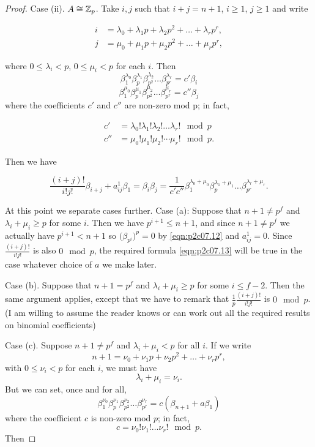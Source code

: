 \documentclass[../main]{subfiles}
\begin{document}
\begin{proof}
Case (ii). $A \cong \mathbb{Z}_p$. Take $i, j$ such that $i + j = n + 1$, $i \ge 1$, $j \ge 1$ and write 

\begin{align*}
i & = \lambda_0 + \lambda_1 p + \lambda_2 p^2 + \ldots + \lambda_r p^r, \\ j & = \mu_0 + \mu_1 p + \mu_2 p^2 + \ldots + \mu_r p^r,
\end{align*}

where $0 \le \lambda_i < p$, $0 \le \mu_i < p$ for each $i$. Then \[\beta_1^{\lambda_0} \beta_p^{\lambda_1} \beta_{p^2}^{\lambda_2} \ldots \beta_{p^r}^{\lambda_r} = c'\beta_i\] \[\beta_1^{\mu_0} \beta_p^{\mu_1} \beta_{p^2}^{\mu_2} \ldots \beta_{p^r}^{\mu_r} = c''\beta_j\] where the coefficients $c'$ and $c''$ are non-zero mod p; in fact,

\begin{align*}
c' & = \lambda_0! \lambda_1! \lambda_2! \ldots \lambda_r! \mod p \\ c'' & = \mu_0! \mu_1! \mu_2! \cdots \mu_r! \mod p.
\end{align*}

Then we have 

\[\frac {(i + j)!} {i! j!} \beta_{i + j} + a_{ij}^1 \beta_1 = \beta_i \beta_j = \frac 1 {c' c''} \beta_1^{\lambda_0 + \mu_0} \beta_p^{\lambda_1 + \mu_1} \ldots \beta_{p^r}^{\lambda_r + \mu_r}.\] 

At this point we separate cases further.
Case (a): Suppose that $n + 1 \ne p^f$ and $\lambda_i + \mu_i \ge p$ for some $i$. Then we have $p^{i + 1} \le n + 1$, and since $n + 1 \ne p^f$ we actually have $p^{i + 1} < n + 1$ so $\big(\beta_{p^i}\big)^p = 0$ by \eqref{eqn:p2c07.12} and $a_{ij}^1 = 0$. Since $\displaystyle \frac {(i + j)!} {i! j!}$ is also $0 \mod p$, the required formula \eqref{eqn:p2c07.13} will be true in the case whatever choice of $a$ we make later.

Case (b). Suppose that $n + 1 = p^f$ and $\lambda_i + \mu_i \ge p$ for some $i \le f - 2$. Then the same argument applies, except that we have to remark that $\displaystyle \frac 1 p \frac {(i + j)!} {i! j!}$ is $0 \mod p$. (I am willing to assume the reader knows or can work out all the required results on binomial coefficients)

Case (c). Suppose $n + 1 \ne p^f$ and $\lambda_i + \mu_i < p$ for all $i$. If we write \[n + 1 = \nu_0 + \nu_1 p + \nu_2 p^2 + \ldots + \nu_r p^r,\] with $0 \le \nu_i < p$ for each $i$, we must have \[\lambda_i + \mu_i = \nu_i.\] But we can set, once and for all, \[\beta_1^{\nu_0} \beta_p^{\nu_1} \beta_{p^2}^{\nu_2} \ldots \beta_{p^r}^{\nu_r} = c(\beta_{n + 1} + a \beta_1)\] where the coefficient $c$ is non-zero mod $p$; in fact, \[c = \nu_0! \nu_1! \ldots \nu_r! \mod p.\] Then


\end{proof}
\end{document}
